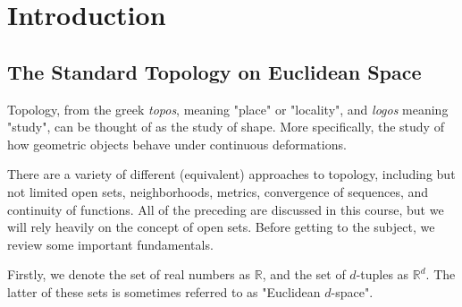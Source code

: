 \chapter{Introduction}

\section{The Standard Topology on Euclidean Space}
Topology, from the greek \textit{topos}, meaning "place" or "locality", and \textit{logos} meaning "study", can be thought of as the study of shape. More specifically, the study of how geometric objects behave under continuous deformations.

There are a variety of different (equivalent) approaches to topology, including but not limited open sets, neighborhoods, metrics, convergence of sequences, and continuity of functions. All of the preceding are discussed in this course, but we will rely heavily on the concept of open sets. Before getting to the subject, we review some important fundamentals.

Firstly, we denote the set of real numbers as $\mathbb{R}$, and the set of $d$-tuples as $\mathbb{R}^{d}$. The latter of these sets is sometimes referred to as "Euclidean $d$-space".


